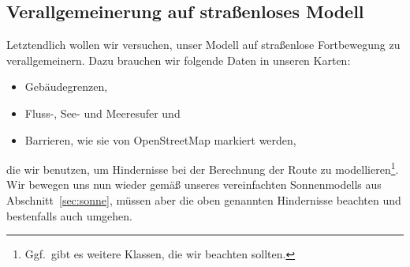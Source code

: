 \documentclass[
    paper=a4,
    DIV14,
    fontsize=12pt,
    pagesize=pdftex,
    toc=bibliographynumbered
]{scrartcl}
\numberwithin{figure}{section}
\numberwithin{equation}{section}
\numberwithin{table}{section}
\begin{document}
\subsection{Verallgemeinerung auf straßenloses Modell}

Letztendlich wollen wir versuchen, unser Modell auf straßenlose Fortbewegung zu
verallgemeinern. Dazu brauchen wir folgende Daten in unseren Karten:
\begin{itemize}
    \item Gebäudegrenzen,
    \item Fluss-, See- und Meeresufer und
    \item Barrieren, wie sie von OpenStreetMap markiert werden,
\end{itemize}
die wir benutzen, um Hindernisse bei der Berechnung der Route zu
modellieren\footnote{Ggf.\ gibt es weitere Klassen, die wir beachten sollten.}. Wir
bewegen uns nun wieder gemäß unseres vereinfachten Sonnenmodells aus
Abschnitt~\ref{sec:sonne}, müssen aber die oben genannten Hindernisse beachten und
bestenfalls auch umgehen.
\end{document}
